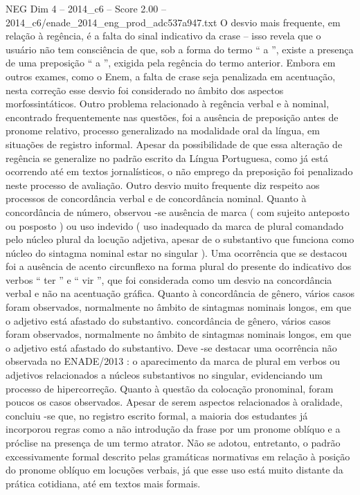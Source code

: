 \begin{textsample}{NEG Dim 4 – 2014\_c6 – Score 2.00 – 2014\_c6/enade\_2014\_eng\_prod\_adc537a947.txt}
O desvio mais frequente, em relação à regência, é a falta do sinal indicativo da crase – isso revela que o usuário não tem consciência de que, sob a forma do termo “ a ”, existe a presença de uma preposição “ a ”, exigida pela regência do termo anterior.
Embora em outros exames, como o Enem, a falta de crase seja penalizada em acentuação, nesta correção esse desvio foi considerado no âmbito dos aspectos morfossintáticos.
Outro problema relacionado à regência verbal e à nominal, encontrado frequentemente nas questões, foi a ausência de preposição antes de pronome relativo, processo generalizado na modalidade oral da língua, em situações de registro informal.
Apesar da possibilidade de que essa alteração de regência se generalize no padrão escrito da Língua Portuguesa, como já está ocorrendo até em textos jornalísticos, o não emprego da preposição foi penalizado neste processo de avaliação.
Outro desvio muito frequente diz respeito aos processos de concordância verbal e de concordância nominal.
Quanto à concordância de número, observou -se ausência de marca ( com sujeito anteposto ou posposto ) ou uso indevido ( uso inadequado da marca de plural comandado pelo núcleo plural da locução adjetiva, apesar de o substantivo que funciona como núcleo do sintagma nominal estar no singular ).
Uma ocorrência que se destacou foi a ausência de acento circunflexo na forma plural do presente do indicativo dos verbos “ ter ” e “ vir ”, que foi considerada como um desvio na concordância verbal e não na acentuação gráfica.
Quanto à concordância de gênero, vários casos foram observados, normalmente no âmbito de sintagmas nominais longos, em que o adjetivo está afastado do substantivo. concordância de gênero, vários casos foram observados, normalmente no âmbito de sintagmas nominais longos, em que o adjetivo está afastado do substantivo.
Deve -se destacar uma ocorrência não observada no ENADE/2013 : o aparecimento da marca de plural em verbos ou adjetivos relacionados a núcleos substantivos no singular, evidenciando um processo de hipercorreção.
Quanto à questão da colocação pronominal, foram poucos os casos observados.
Apesar de serem aspectos relacionados à oralidade, concluiu -se que, no registro escrito formal, a maioria dos estudantes já incorporou regras como a não introdução da frase por um pronome oblíquo e a próclise na presença de um termo atrator.
Não se adotou, entretanto, o padrão excessivamente formal descrito pelas gramáticas normativas em relação à posição do pronome oblíquo em locuções verbais, já que esse uso está muito distante da prática cotidiana, até em textos mais formais.

\end{textsample}
